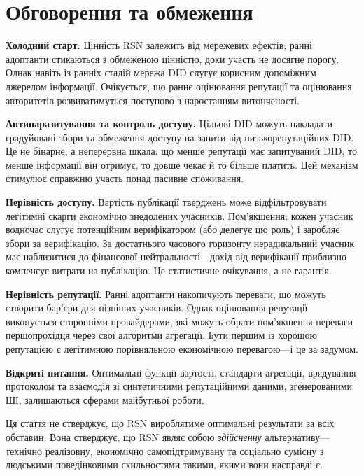 \documentclass[11pt,a4paper,twocolumn]{article}
\begin{document}
\section{Обговорення та обмеження}

\textbf{Холодний старт.} Цінність RSN залежить від мережевих ефектів; ранні адоптанти стикаються з обмеженою цінністю, доки участь не досягне порогу. Однак навіть із ранніх стадій мережа DID слугує корисним допоміжним джерелом інформації. Очікується, що раннє оцінювання репутації та оцінювання авторитетів розвиватимуться поступово з наростанням витонченості.

\textbf{Антипаразитування та контроль доступу.} Цільові DID можуть накладати градуйовані збори та обмеження доступу на запити від низькорепутаційних DID. Це не бінарне, а неперервна шкала: що менше репутації має запитуваний DID, то менше інформації він отримує, то довше чекає й то більше платить. Цей механізм стимулює справжню участь понад пасивне споживання.

\textbf{Нерівність доступу.} Вартість публікації тверджень може відфільтровувати легітимні скарги економічно знедолених учасників. Пом'якшення: кожен учасник водночас слугує потенційним верифікатором (або делегує цю роль) і заробляє збори за верифікацію. За достатнього часового горизонту нерадикальний учасник має наблизитися до фінансової нейтральності---дохід від верифікації приблизно компенсує витрати на публікацію. Це статистичне очікування, а не гарантія.

\textbf{Нерівність репутації.} Ранні адоптанти накопичують переваги, що можуть створити бар'єри для пізніших учасників. Однак оцінювання репутації виконується сторонніми провайдерами, які можуть обрати пом'якшення переваги першопрохідця через свої алгоритми агрегації. Бути першим із хорошою репутацією є легітимною порівняльною економічною перевагою---і це за задумом.

\textbf{Відкриті питання.} Оптимальні функції вартості, стандарти агрегації, врядування протоколом та взаємодія зі синтетичними репутаційними даними, згенерованими ШІ, залишаються сферами майбутньої роботи.

Ця стаття не стверджує, що RSN вироблятиме оптимальні результати за всіх обставин. Вона стверджує, що RSN являє собою \emph{здійсненну} альтернативу---технічно реалізовну, економічно самопідтримувану та соціально сумісну з людськими поведінковими схильностями такими, якими вони насправді є.
\end{document}
